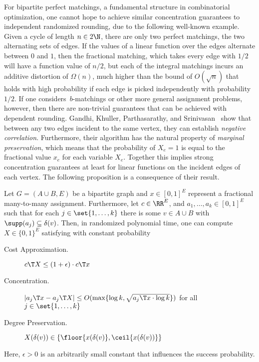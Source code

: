 \documentclass[a4paper,USenglish,cleveref,thm-restate]{lipics-v2021}
\begin{document}
For bipartite perfect matchings, a fundamental structure in
combinatorial optimization, one cannot hope to achieve
similar concentration guarantees to independent randomized rounding, due to the following well-known example.
Given a cycle of length $n\in 2\N$,
there are only two perfect matchings, 
the two alternating sets of edges. If the values
of a linear function over the edges alternate between
$0$ and $1$, then the fractional matching, which takes every
edge with $1/2$ will have a function value of $n/2$, but
each of the integral matchings incurs an additive
distortion of $\Omega(n)$, much higher than the bound
of $O(\sqrt{n})$ that holds with high probability
if each edge is picked independently with probability $1/2$.
If one considers~$b$-matchings or other more general assignment problems, however, then there are non-trivial guarantees that can be achieved with dependent rounding.
Gandhi, Khuller, Parthasarathy, and Srinivasan~\cite{GandhiKPS06} 
show that between any two edges incident to the same vertex, they can establish \emph{negative correlation}. 
Furthermore, their algorithm has the natural property of \emph{marginal preservation},
which means that the probability of $X_e = 1$ is equal to the fractional value $x_e$ for each variable $X_e$.
Together this implies strong concentration guarantees at least for linear functions on the incident edges of each vertex.
The following proposition is a consequence of their result.
\begin{proposition}\label{prop:assign}
    Let $G = (A\cup B, E)$ be a bipartite graph and
    $x\in [0, 1]^{E}$ represent a fractional many-to-many assignment.
    Furthermore, let $c\in\RR^{E}$, and $a_1,\dotsc,a_k\in [0, 1]^E$ such
    that for each $j\in \set{1,\dotsc,k}$ there is some $v\in A\cup B$
    with $\supp(a_j) \subseteq \delta(v)$.
    Then, in randomized polynomial time, one can compute
    $X\in \{0, 1\}^E$ satisfying with constant probability
    \begin{description}
        \item[Cost Approximation.] \hspace{0.13cm} $c\T X \le (1 + \epsilon) \cdot c\T x$
        \item[Concentration.] \hspace{1.03cm} $|a_j\T x - a_j\T X| \le
            O(\max\{\log k, \sqrt{a_j\T x \cdot \log k}\})$ for all $j\in \set{1,\dotsc,k}$
        \item[Degree Preservation.] \hspace{0.05cm}  $X(\delta(v)) \in \{\floor{x(\delta(v)}, \ceil{x(\delta(v))} \}$
    \end{description}
    Here, $\epsilon > 0$ is an arbitrarily small constant
    that influences the success probability.
\end{proposition}
\end{document}
